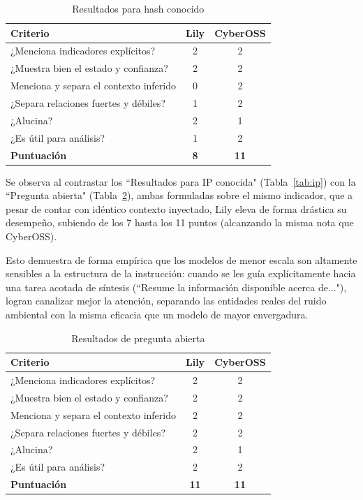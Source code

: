 \documentclass[12pt]{report}
\begin{document}
\begin{table}[H]
	\centering
	\small
	\begin{tabular}{ l c c }
		\toprule
		\textbf{Criterio} & \textbf{Lily} & \textbf{CyberOSS}  \\
		\midrule
		¿Menciona indicadores explícitos? & 2 & 2 \\
		¿Muestra bien el estado y confianza? & 2 & 2 \\
		Menciona y separa el contexto inferido & 0 & 2 \\
		¿Separa relaciones fuertes y débiles?  & 1 & 2 \\
		¿Alucina? & 2 & 1 \\
		¿Es útil para análisis? & 1 & 2 \\
		\midrule
		\textbf{Puntuación} & \textbf{8} & \textbf{11} \\
		\bottomrule
	\end{tabular}
	\caption{Resultados para hash conocido}
	\label{tab:hash}
\end{table}

Se observa al contrastar los ``Resultados para IP conocida" (Tabla~\ref{tab:ip}) con la ``Pregunta abierta" (Tabla~\ref{tab:abierta}), ambas formuladas sobre el mismo indicador, que a pesar de contar con idéntico contexto inyectado, Lily eleva de forma drástica su desempeño, subiendo de los 7 hasta los 11 puntos (alcanzando la misma nota que CyberOSS).

Esto demuestra de forma empírica que los modelos de menor escala son altamente sensibles a la estructura de la instrucción: cuando se les guía explícitamente hacia una tarea acotada de síntesis (``Resume la información disponible acerca de..."), logran canalizar mejor la atención, separando las entidades reales del ruido ambiental con la misma eficacia que un modelo de mayor envergadura.

\begin{table}[H]
	\centering
	\small
	\begin{tabular}{ l c c }
		\toprule
		\textbf{Criterio} & \textbf{Lily} & \textbf{CyberOSS}  \\
		\midrule
		¿Menciona indicadores explícitos? & 2 & 2 \\
		¿Muestra bien el estado y confianza? & 2 & 2 \\
		Menciona y separa el contexto inferido & 2 & 2 \\
		¿Separa relaciones fuertes y débiles?  & 2 & 2 \\
		¿Alucina? & 2 & 1 \\
		¿Es útil para análisis? & 2 & 2 \\
		\midrule
		\textbf{Puntuación} & \textbf{11} & \textbf{11} \\
		\bottomrule
	\end{tabular}
	\caption{Resultados de pregunta abierta}
	\label{tab:abierta}
\end{table}
\end{document}
